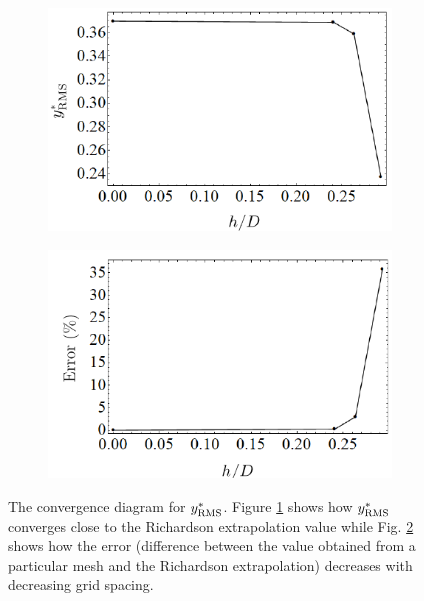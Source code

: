 \documentclass[oneside]{utmthesis}
\begin{document}
\begin{figure}
  \centering
  \begin{subfigure}[h]{0.38\textwidth}
    \includegraphics[width=\textwidth]{figs/gciYrms-1}
    \caption{}
    \label{fig:gciYrms-1}
  \end{subfigure}
  \hspace{6mm}
  \begin{subfigure}[h]{0.38\textwidth}
    \includegraphics[width=\textwidth]{figs/gciYrms-2}
    \caption{}
    \label{fig:gciYrms-2}
  \end{subfigure}

  \caption{The convergence diagram for $y^{*}_{\text{RMS}}$. Figure \ref{fig:gciYrms-1} shows how $y^{*}_{\text{RMS}}$ converges close to the Richardson extrapolation value while Fig. \ref{fig:gciYrms-2} shows how the error (difference between the value obtained from a particular mesh and the Richardson extrapolation) decreases with decreasing grid spacing.} \label{fig:gciYrms}
\end{figure}
\end{document}
